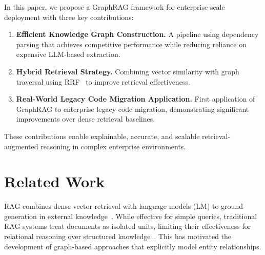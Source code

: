 \documentclass[runningheads]{llncs}
\begin{document}
In this paper, we propose a GraphRAG framework for enterprise-scale deployment with three key contributions: 
\begin{enumerate}
    \item \textbf{Efficient Knowledge Graph Construction.} A pipeline using dependency parsing that achieves competitive performance while reducing reliance on expensive LLM-based extraction.
    \item \textbf{Hybrid Retrieval Strategy.} Combining vector similarity with graph traversal using RRF~\cite{cormack2009reciprocal} to improve retrieval effectiveness.
    \item \textbf{Real-World Legacy Code Migration Application.} First application of GraphRAG to enterprise legacy code migration, demonstrating significant improvements over dense retrieval baselines.
\end{enumerate}
These contributions enable explainable, accurate, and scalable retrieval-augmented reasoning in complex enterprise environments.

\section{Related Work}
RAG combines dense-vector retrieval with language models (LM) to ground generation in external knowledge~\cite{lewis2020retrieval}. While effective for simple queries, traditional RAG systems treat documents as isolated units, limiting their effectiveness for relational reasoning over structured knowledge~\cite{barnett2024seven,bruckhaus2024rag}. This has motivated the development of graph-based approaches that explicitly model entity relationships.
\end{document}
